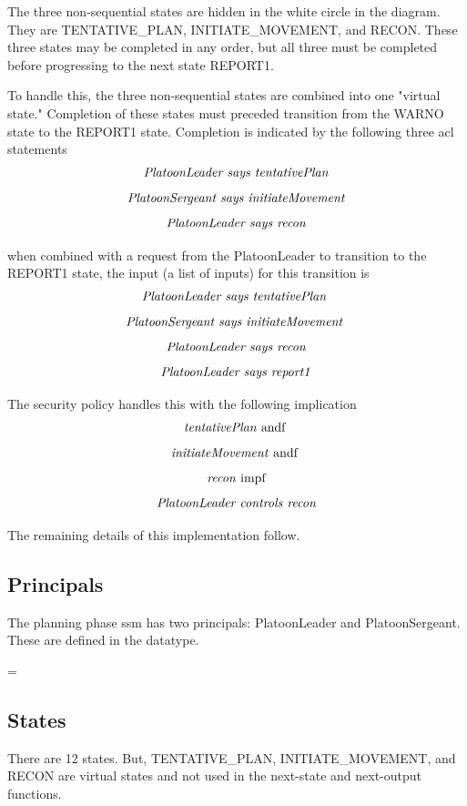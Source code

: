 \documentclass[../../main/main.tex]{subfiles}
\begin{document}
The three non-sequential states are hidden in the white circle in the diagram.  They are TENTATIVE_PLAN, INITIATE_MOVEMENT, and RECON. These three states may be completed in any order, but all three must be completed before progressing to the next state REPORT1.  

To handle this, the three non-sequential states are combined into one "virtual state."  Completion of these states must preceded transition from the WARNO state to the REPORT1 state.  Completion is indicated by the following three \gls{acl} statements 
\[\text{\textit{PlatoonLeader says tentativePlan}}\]
\[\text{\textit{PlatoonSergeant says initiateMovement}}\]
\[\text{\textit{PlatoonLeader says recon}}\]


when combined with a request from the PlatoonLeader to transition to the REPORT1 state, the input (a list of inputs) for this transition is
\[\text{\textit{PlatoonLeader says tentativePlan}  }\]
\[\text{\textit{PlatoonSergeant says initiateMovement}  }\]
\[\text{\textit{PlatoonLeader says recon}}\]
\[\text{\textit{PlatoonLeader says report1}}\]

The security policy handles this with the following implication
\[\text{\textit{tentativePlan} andf  }\]
\[\text{\textit{initiateMovement} andf  }\]
\[\text{\textit{recon} impf}\]
\[\text{\textit{PlatoonLeader controls recon}}\]

The remaining details of this implementation follow.
\subsection{Principals}
The planning phase \gls{ssm} has two principals: PlatoonLeader and PlatoonSergeant.  These are defined in the  datatype.

 =  \HOLTokenBar{} 

\subsection{States}
There are 12 states.  But, TENTATIVE_PLAN, INITIATE_MOVEMENT, and RECON are virtual states and not used in the next-state and next-output functions.
\end{document}

